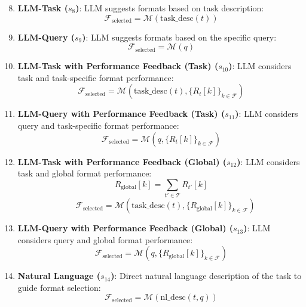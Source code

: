 \begin{enumerate}
    \setcounter{enumi}{7}
    \item \textbf{LLM-Task ($s_8$)}: LLM suggests formats based on task description:
    \begin{equation}
    \mathcal{F}_{\text{selected}} = \mathcal{M}(\text{task\_desc}(t))
    \end{equation}
    
    \item \textbf{LLM-Query ($s_9$)}: LLM suggests formats based on the specific query:
    \begin{equation}
    \mathcal{F}_{\text{selected}} = \mathcal{M}(q)
    \end{equation}
    
    \item \textbf{LLM-Task with Performance Feedback (Task) ($s_{10}$)}: LLM considers task and task-specific format performance:
    \begin{equation}
    \mathcal{F}_{\text{selected}} = \mathcal{M}(\text{task\_desc}(t), \{R_t[k]\}_{k \in \mathcal{F}})
    \end{equation}
    
    \item \textbf{LLM-Query with Performance Feedback (Task) ($s_{11}$)}: LLM considers query and task-specific format performance:
    \begin{equation}
    \mathcal{F}_{\text{selected}} = \mathcal{M}(q, \{R_t[k]\}_{k \in \mathcal{F}})
    \end{equation}
    
    \item \textbf{LLM-Task with Performance Feedback (Global) ($s_{12}$)}: LLM considers task and global format performance:
    \begin{equation}
    R_{\text{global}}[k] = \sum_{t' \in \mathcal{T}} R_{t'}[k]
    \end{equation}
    \begin{equation}
    \quad \mathcal{F}_{\text{selected}} = \mathcal{M}(\text{task\_desc}(t), \{R_{\text{global}}[k]\}_{k \in \mathcal{F}})
    \end{equation}
    
    \item \textbf{LLM-Query with Performance Feedback (Global) ($s_{13}$)}: LLM considers query and global format performance:
    \begin{equation}
    \mathcal{F}_{\text{selected}} = \mathcal{M}(q, \{R_{\text{global}}[k]\}_{k \in \mathcal{F}})
    \end{equation}
    
    \item \textbf{Natural Language ($s_{14}$)}: Direct natural language description of the task to guide format selection:
    \begin{equation}
    \mathcal{F}_{\text{selected}} = \mathcal{M}(\text{nl\_desc}(t, q))
    \end{equation}
\end{enumerate}

